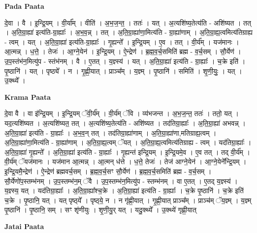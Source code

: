 \documentclass[17pt]{extarticle}
\begin{document}
\textbf{Pada Paata} \newline

दे॒वा । वै । इ॒न्द्रि॒यम् । वी॒र्या᳚म् । वीति॑ । अ॒भ॒ज॒न्त॒ । ततः॑ । यत् । अ॒त्यशि॑ष्य॒तेत्य॑ति - अशि॑ष्यत । तत् । अ॒ति॒ग्रा॒ह्या॑ इत्य॑ति-ग्रा॒ह्याः᳚ । अ॒भ॒व॒न्न् । तत् । अ॒ति॒ग्रा॒ह्या॑णा॒मित्य॑ति - ग्रा॒ह्या॑णाम् । अ॒ति॒ग्रा॒ह्य॒त्वमित्य॑तिग्राह्य - त्वम् । यत् । अ॒ति॒ग्रा॒ह्या॑ इत्य॑ति-ग्रा॒ह्याः᳚ । गृ॒ह्यन्ते᳚ । इ॒न्द्रि॒यम् । ए॒व । तत् । वी॒र्य᳚म् । यज॑मानः । आ॒त्मन्न् । ध॒त्ते॒ । तेजः॑ । आ॒ग्ने॒येन॑ । इ॒न्द्रि॒यम् । ऐ॒न्द्रेण॑ । ब्र॒ह्म॒व॒र्च॒समिति॑ ब्रह्म - व॒र्च॒सम् । सौ॒र्येण॑ । उ॒प॒स्तंभ॑न॒मित्यु॑प - स्तंभ॑नम् । वै । ए॒तत् । य॒ज्ञ्स्य॑ । यत् । अ॒ति॒ग्रा॒ह्या॑ इत्य॑ति - ग्रा॒ह्याः᳚ । च॒क्रे इति॑ । पृ॒ष्ठानि॑ । यत् । पृष्ठ्ये᳚ । न । गृ॒ह्णी॒यात् । प्राञ्च᳚म् । य॒ज्ञ्म् । पृ॒ष्ठानि॑ । समिति॑ । शृ॒णी॒युः॒ । यत् । उ॒क्थ्ये᳚ ।  \newline


\textbf{Krama Paata} \newline

दे॒वा वै । वा इ॑न्द्रि॒यम् । इ॒न्द्रि॒यम् ॅवी॒र्य᳚म् । वी॒र्य॑म् ॅवि । व्य॑भजन्त । अ॒भ॒ज॒न्त॒ ततः॑ । ततो॒ यत् । यद॒त्यशि॑ष्यत । अ॒त्यशि॑ष्यत॒ तत् । अ॒त्यशि॑ष्य॒तेत्य॑ति - अशि॑ष्यत । तद॑तिग्रा॒ह्याः᳚ । अ॒ति॒ग्रा॒ह्या॑ अभवन्न् । अ॒ति॒ग्रा॒ह्या॑ इत्य॑ति - ग्रा॒ह्याः᳚ । अ॒भ॒व॒न् तत् । तद॑तिग्रा॒ह्या॑णाम् । अ॒ति॒ग्रा॒ह्या॑णा,मतिग्राह्य॒त्वम् । अ॒ति॒ग्रा॒ह्या॑णा॒मित्य॑ति - ग्रा॒ह्या॑णाम् । अ॒ति॒ग्रा॒ह्य॒त्वम् ॅयत् । अ॒ति॒ग्रा॒ह्य॒त्वमित्य॑तिग्राह्य - त्वम् । यद॑तिग्रा॒ह्याः᳚ । अ॒ति॒ग्रा॒ह्या॑ गृ॒ह्यन्ते᳚ । अ॒ति॒ग्रा॒ह्या॑ इत्य॑ति - ग्रा॒ह्याः᳚ । गृ॒ह्यन्त॑ इन्द्रि॒यम् । इ॒न्द्रि॒यमे॒व । ए॒व तत् । तद् वी॒र्य᳚म् । वी॒र्य॑म् ॅयज॑मानः । यज॑मान आ॒त्मन्न् । आ॒त्मन् ध॑त्ते । ध॒त्ते॒ तेजः॑ । तेज॑ आग्ने॒येन॑ । आ॒ग्ने॒येने᳚न्द्रि॒यम् । इ॒न्द्रि॒यमै॒न्द्रेण॑ । ऐ॒न्द्रेण॑ ब्रह्मवर्च॒सम् । ब्र॒ह्म॒व॒र्च॒सꣳ सौ॒र्येण॑ । ब्र॒ह्म॒व॒र्च॒समिति॑ ब्रह्म - व॒र्च॒सम् । सौ॒र्येणो॑प॒स्तम्भ॑नम् । उ॒प॒स्तम्भ॑न॒म् ॅवै । उ॒प॒स्तम्भ॑न॒मित्यु॑प - स्तम्भ॑नम् । वा ए॒तत् । ए॒तद् य॒ज्ञ्स्य॑ । य॒ज्ञ्स्य॒ यत् । यद॑तिग्रा॒ह्याः᳚ । अ॒ति॒ग्रा॒ह्या᳚श्च॒क्रे । अ॒ति॒ग्रा॒ह्या॑ इत्य॑ति - ग्रा॒ह्याः᳚ । च॒क्रे पृ॒ष्ठानि॑ । च॒क्रे इति॑ च॒क्रे । पृ॒ष्ठानि॒ यत् । यत् पृष्ठ्‍ये᳚ । पृष्ठ्‍ये॒ न । न गृ॑ह्णी॒यात् । गृ॒ह्णी॒यात् प्राञ्च᳚म् । प्राञ्च॑म् ॅय॒ज्ञ्म् । य॒ज्ञ्म् पृ॒ष्ठानि॑ । पृ॒ष्ठानि॒ सम् । सꣳ शृ॑णीयुः । शृ॒णी॒यु॒र् यत् । यदु॒क्थ्ये᳚ । उ॒क्थ्ये॑ गृह्णी॒यात् \newline

\textbf{Jatai Paata} \newline
\end{document}
